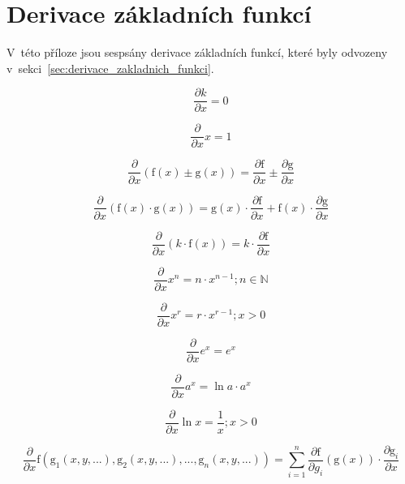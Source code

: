 \chapter{Derivace základních funkcí}

V~této příloze jsou sespsány derivace základních funkcí, které byly odvozeny v~sekci~\ref{sec:derivace_zakladnich_funkci}.

\begin{equation}
\frac{\partial k}{\partial x} = 0
\end{equation}

\begin{equation}
\frac{\partial}{\partial x} x = 1
\end{equation}

\begin{equation}
\frac{\partial}{\partial x} (\mathrm{f}(x) \pm \mathrm{g}(x)) = \frac{\partial \mathrm{f}}{\partial x} \pm \frac{\partial \mathrm{g}}{\partial x}
\end{equation}

\begin{equation}
\frac{\partial}{\partial x} (\mathrm{f}(x) \cdot \mathrm{g}(x)) = \mathrm{g}(x) \cdot \frac{\partial \mathrm{f}}{\partial x} + \mathrm{f}(x) \cdot \frac{\partial \mathrm{g}}{\partial x}
\end{equation}

\begin{equation}
\frac{\partial}{\partial x} (k \cdot \mathrm{f}(x)) = k \cdot \frac{\partial \mathrm{f}}{\partial x}
\end{equation}

\begin{equation}
\frac{\partial}{\partial x} x^n = n \cdot x^{n-1}; n \in \mathbb{N}
\end{equation}

\begin{equation}
\frac{\partial}{\partial x} x^r = r \cdot x^{r-1}; x > 0
\end{equation}

\begin{equation}
\frac{\partial}{\partial x} e^x = e^x
\end{equation}

\begin{equation}
\frac{\partial}{\partial x} a^x = \ln a \cdot a^x
\end{equation}

\begin{equation}
\frac{\partial}{\partial x} \ln x = \frac{1}{x}; x > 0
\end{equation}

\begin{equation}
\frac{\partial}{\partial x} \mathrm{f} (\mathrm{g}_1(x, y, ...), \mathrm{g}_2(x, y, ...), ..., \mathrm{g}_n(x, y, ...)) = \sum_{i=1}^n \frac{\partial \mathrm{f}}{\partial g_i}(\mathrm{g}(x)) \cdot \frac{\partial \mathrm{g}_i}{\partial x}
\end{equation}
